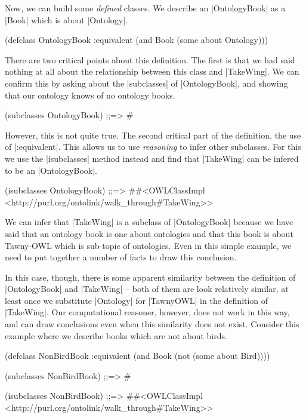Now, we can build some \emph{defined} classes. We describe an |OntologyBook|
as a |Book| which is about |Ontology|.

\begin{tawny}
(defclass
 OntologyBook
 :equivalent
 (and Book
      (some about Ontology)))
\end{tawny}

There are two critical points about this definition. The first is that we had
said nothing at all about the relationship between this class and |TakeWing|.
We can confirm this by asking about the |subclasses| of |OntologyBook|, and
showing that our ontology knows of no ontology books.

\begin{tawny}
(subclasses OntologyBook)
;;=> #{}
\end{tawny}

However, this is not quite true. The second critical part of the definition,
the use of |:equivalent|. This allows us to use \emph{reasoning} to infer
other subclasses. For this we use the |isubclasses| method instead and find
that |TakeWing| can be infered to be an |OntologyBook|.

\begin{tawny}
(isubclasses OntologyBook)
;;=> #{#<OWLClassImpl <http://purl.org/ontolink/walk_through#TakeWing>>}
\end{tawny}

We can infer that |TakeWing| is a subclass of |OntologyBook| because we have
said that an ontology book is one about ontologies and that this book is about
Tawny-OWL which is sub-topic of ontologies. Even in this simple example, we
need to put together a number of facts to draw this conclusion.

In this case, though, there is some apparent similarity between the definition
of |OntologyBook| and |TakeWing| -- both of them are look relatively similar,
at least once we substitute |Ontology| for |TawnyOWL| in the definition of
|TakeWing|. Our computational reasoner, however, does not work in this way,
and can draw conclusions even when this similarity does not exist. Consider
this example where we describe books which are not about birds.

\begin{tawny}
(defclass NonBirdBook
  :equivalent
  (and Book
       (not (some about Bird))))

(subclasses NonBirdBook)
;;=> #{}

(isubclasses NonBirdBook)
;;=> #{#<OWLClassImpl <http://purl.org/ontolink/walk_through#TakeWing>>}
\end{tawny}

